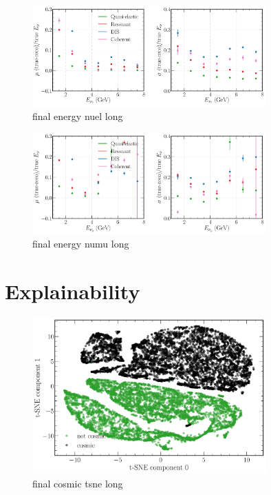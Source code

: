 \begin{figure} %
    \includegraphics[width=0.8\textwidth]{diagrams/7-cvn/chipsnet/final_energy_nuel.pdf}
    \caption[final energy nuel short]
    {final energy nuel long}
    \label{fig:final_energy_nuel}
\end{figure}

\begin{figure} %
    \includegraphics[width=0.8\textwidth]{diagrams/7-cvn/chipsnet/final_energy_numu.pdf}
    \caption[final energy numu short]
    {final energy numu long}
    \label{fig:final_energy_numu}
\end{figure}

\section{Explainability} %
\label{sec:cvn_explain} %

\begin{figure} %
    \includegraphics[width=0.8\textwidth]{diagrams/7-cvn/chipsnet/final_cosmic_tsne.pdf}
    \caption[final cosmic tsne short]
    {final cosmic tsne long}
    \label{fig:final_cosmic_tsne}
\end{figure}

